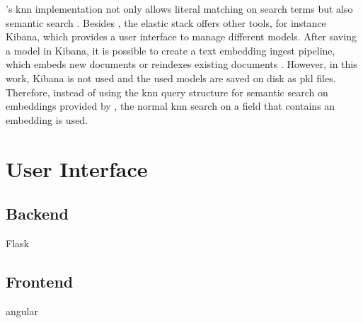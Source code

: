 \databaseName{}'s \ac{knn} implementation not only allows literal matching on search terms but also semantic search \cite{Elasticsearch-knn}.
Besides \databaseName{}, the elastic stack offers other tools, for instance Kibana, which provides a user interface to manage different models.
After saving a model in Kibana, it is possible to create a text embedding ingest pipeline, which embeds new documents or reindexes existing documents \cite{Elasticsearch-knn-embedding}.
However, in this work, Kibana is not used and the used models are saved on disk as \ac{pkl} files.
Therefore, instead of using the \ac{knn} query structure for semantic search on embeddings provided by \databaseName{}, the normal \ac{knn} search on a field that contains an embedding is used.


\section{User Interface}\label{sec:ui}

\subsection{Backend}\label{subsec:backend}
Flask

\subsection{Frontend}\label{subsec:frontend}
angular